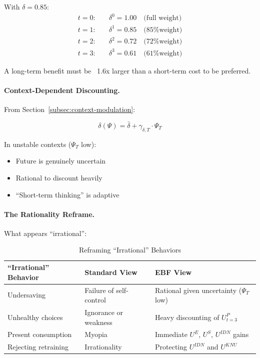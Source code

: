 With $\delta = 0.85$:
\begin{align}
t=0: \quad & \delta^0 = 1.00 \quad \text{(full weight)} \\
t=1: \quad & \delta^1 = 0.85 \quad \text{(85\% weight)} \\
t=2: \quad & \delta^2 = 0.72 \quad \text{(72\% weight)} \\
t=3: \quad & \delta^3 = 0.61 \quad \text{(61\% weight)}
\end{align}

A long-term benefit must be ~1.6x larger than a short-term cost to be preferred.

\paragraph{Context-Dependent Discounting.}
From Section~\ref{subsec:context-modulation}:

\begin{equation}
\delta(\Psi) = \bar{\delta} + \gamma_{\delta,T} \cdot \Psi_T
\end{equation}

In unstable contexts ($\Psi_T$ low):
\begin{itemize}
\item Future is genuinely uncertain
\item Rational to discount heavily
\item ``Short-term thinking'' is adaptive
\end{itemize}

\paragraph{The Rationality Reframe.}
What appears ``irrational'':

\begin{table}[htbp]
\centering
\caption{Reframing ``Irrational'' Behaviors}
\label{tab:rationality-reframe}
\renewcommand{\arraystretch}{1.3}
\begin{tabular}{@{}lp{5cm}p{5cm}@{}}
\toprule
\textbf{``Irrational'' Behavior} & \textbf{Standard View} & \textbf{EBF View} \\
\midrule
Undersaving & Failure of self-control & Rational given uncertainty ($\Psi_T$ low) \\
Unhealthy choices & Ignorance or weakness & Heavy discounting of $U^P_{t=3}$ \\
Present consumption & Myopia & Immediate $U^E$, $U^S$, $U^{IDN}$ gains \\
Rejecting retraining & Irrationality & Protecting $U^{IDN}$ and $U^{KNU}$ \\
\bottomrule
\end{tabular}
\end{table}

